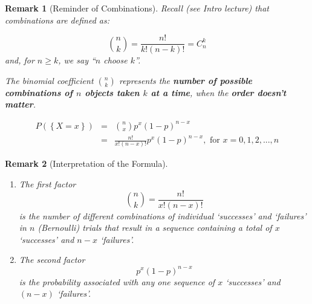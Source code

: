 \documentclass[smaller]{beamer}\usepackage[]{graphicx}\usepackage[]{color}
\newtheorem{remark}{Remark}[section]
\begin{document}
\begin{frame}{\secname}

 \begin{remark}[Reminder of Combinations]
  Recall (see Intro lecture) that combinations are defined as:

  \begin{equation*}
  {n \choose k} =\frac{n!}{k!\left( n-k\right) !}=C^{k}_{n}
  \end{equation*}
  and, for $n \geq k$, we say ``$n$ choose $k$''.

  \bigskip

  The binomial coefficient ${n \choose k}$ represents the \textbf{number of possible combinations of $n$ objects taken $k$ at a time}, when the \textbf{order doesn't matter}.

  \bigskip

  \end{remark}
\end{frame}


\begin{frame}{\secname}

\begin{definition}
  \begin{eqnarray}
  P ( \left\{ X=x\right\})&=&{n \choose x} p^{x}\left( 1-p\right) ^{n-x} \\
  &=&\frac{n!}{x!\left( n-x\right) !}p^{x}\left( 1-p\right) ^{n-x},\text{ for }
  x=0,1,2,...,n \label{Eq: Binom}
  \end{eqnarray}
\end{definition}

\begin{remark}[Interpretation of the Formula]
\begin{footnotesize}
  \begin{enumerate}
  \item The first factor $${n \choose k} =\frac{n!}{x!\left( n-x\right) !}$$ is the number of different
  combinations of individual `successes' and `failures'  in $n$ (Bernoulli) trials that result in a sequence containing a total of $x$ `successes' and $n-x$ `failures'.
  \item The second factor $$p^{x}\left( 1-p\right) ^{n-x}$$ is the probability associated with any one
  sequence of $x$ `successes' and $(n-x)$ `failures'.
  \end{enumerate}
  \end{footnotesize}
\end{remark}

\end{frame}
\end{document}
